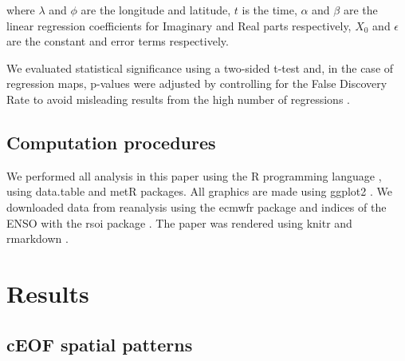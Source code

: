 \documentclass[smallextended]{svjour3}       %
\begin{document}
where \(\lambda\) and \(\phi\) are the longitude and latitude, \(t\) is the time, \(\alpha\) and \(\beta\) are the linear regression coefficients for Imaginary and Real parts respectively, \(X_0\) and \(\epsilon\) are the constant and error terms respectively.

We evaluated statistical significance using a two-sided t-test and, in the case of regression maps, p-values were adjusted by controlling for the False Discovery Rate \citep{benjamini1995, wilks2016} to avoid misleading results from the high number of regressions \citep{walker1914, katz1991}.

\hypertarget{computation-procedures}{%
\subsection{Computation procedures}\label{computation-procedures}}

We performed all analysis in this paper using the R programming language \citep{rcoreteam2020}, using data.table \citep{dowle2020} and metR \citep{campitelli2020} packages. All graphics are made using ggplot2 \citep{wickham2009}. We downloaded data from reanalysis using the ecmwfr package \citep{hufkens2020} and indices of the ENSO with the rsoi package \citep{albers2020}. The paper was rendered using knitr and rmarkdown \citep{xie2015, allaire2020}.

\hypertarget{results}{%
\section{Results}\label{results}}

\hypertarget{spatial}{%
\subsection{cEOF spatial patterns}\label{spatial}}
\end{document}
